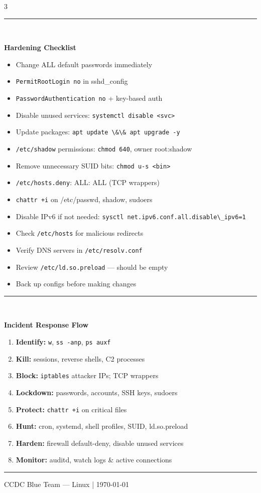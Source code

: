\documentclass[10pt,landscape]{article}
\newcommand{\colorsec}[2]{%
  \vspace{1.5ex plus 0.5ex minus 0.5ex}%
  \noindent\rule{\linewidth}{0.4pt}\\[-0.7ex]%
  \noindent\colorbox{#1}{\parbox{\dimexpr\linewidth-2\fboxsep}{%
    \strut\textbf{\normalsize\color{sblue} #2}}}%
  \vspace{0.5ex}\par\nobreak%
}
\begin{document}
\begin{multicols}{3}
\colorsec{secgray}{Hardening Checklist}
\begin{itemize} \itemsep0pt \parskip0pt  
\item Change ALL default passwords immediately
\item \verb!PermitRootLogin no! in sshd\_config
\item \verb!PasswordAuthentication no! + key-based auth
\item Disable unused services: \verb!systemctl disable <svc>!
\item Update packages: \verb!apt update \&\& apt upgrade -y!
\item \verb!/etc/shadow! permissions: \verb!chmod 640!, owner root:shadow
\item Remove unnecessary SUID bits: \verb!chmod u-s <bin>!
\item \verb!/etc/hosts.deny!: ALL: ALL (TCP wrappers)
\item \verb!chattr +i! on /etc/passwd, shadow, sudoers
\item Disable IPv6 if not needed: \verb!sysctl net.ipv6.conf.all.disable\_ipv6=1!
\item Check \verb!/etc/hosts! for malicious redirects
\item Verify DNS servers in \verb!/etc/resolv.conf!
\item Review \verb!/etc/ld.so.preload! --- should be empty
\item Back up configs before making changes
\end{itemize}

\colorsec{secgray}{Incident Response Flow}
\begin{enumerate} \itemsep0pt \parskip0pt  
\item \textbf{Identify:} \verb!w!, \verb!ss -anp!, \verb!ps auxf!
\item \textbf{Kill:} sessions, reverse shells, C2 processes
\item \textbf{Block:} \verb!iptables! attacker IPs; TCP wrappers
\item \textbf{Lockdown:} passwords, accounts, SSH keys, sudoers
\item \textbf{Protect:} \verb!chattr +i! on critical files
\item \textbf{Hunt:} cron, systemd, shell profiles, SUID, ld.so.preload
\item \textbf{Harden:} firewall default-deny, disable unused services
\item \textbf{Monitor:} auditd, watch logs \& active connections
\end{enumerate}

\rule{0.3\linewidth}{0.25pt}
\scriptsize

CCDC Blue Team --- Linux | \today

\end{multicols}
\end{document}
